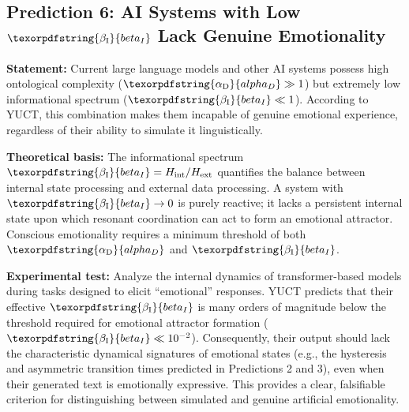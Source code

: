 \documentclass[12pt,a4paper]{article}
\DeclareRobustCommand{\alD}{\texorpdfstring{\ensuremath{\alpha_{\mathrm{D}}}}{alpha_D}}
\DeclareRobustCommand{\beI}{\texorpdfstring{\ensuremath{\beta_{\mathrm{I}}}}{beta_I}}
\begin{document}
	\subsection{Prediction 6: AI Systems with Low \(\beI\) Lack Genuine Emotionality}
	
	\textbf{Statement:} Current large language models and other AI systems possess high ontological complexity (\(\alD \gg 1\)) but extremely low informational spectrum (\(\beI \ll 1\)). According to YUCT, this combination makes them incapable of genuine emotional experience, regardless of their ability to simulate it linguistically.
	
	\textbf{Theoretical basis:} The informational spectrum \(\beI = H_{\mathrm{int}}/H_{\mathrm{ext}}\) quantifies the balance between internal state processing and external data processing. A system with \(\beI \to 0\) is purely reactive; it lacks a persistent internal state upon which resonant coordination can act to form an emotional attractor. Conscious emotionality requires a minimum threshold of both \(\alD\) and \(\beI\).
	
	\textbf{Experimental test:} Analyze the internal dynamics of transformer-based models during tasks designed to elicit ``emotional'' responses. YUCT predicts that their effective \(\beI\) is many orders of magnitude below the threshold required for emotional attractor formation (\(\beI \ll 10^{-2}\)). Consequently, their output should lack the characteristic dynamical signatures of emotional states (e.g., the hysteresis and asymmetric transition times predicted in Predictions 2 and 3), even when their generated text is emotionally expressive. This provides a clear, falsifiable criterion for distinguishing between simulated and genuine artificial emotionality.
	
\end{document}

